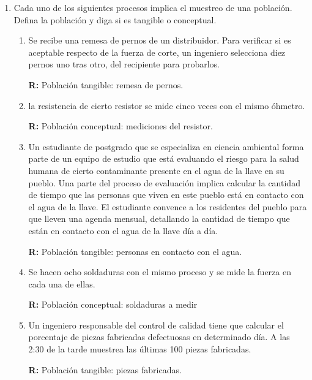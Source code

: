 \documentclass[10pt,a4paper]{book}
\begin{document}
\begin{enumerate}
	\item Cada uno de los siguientes procesos implica el muestreo de una población. Defina la población y diga si es tangible o conceptual.
	\begin{enumerate}
		\item Se recibe una remesa de pernos de un distribuidor. Para verificar si es aceptable respecto de la fuerza de corte, un ingeniero selecciona diez pernos uno tras otro, del recipiente para probarlos.
		
		\textbf{R:} Población tangible: remesa de pernos.\\
		
		\item la resistencia de cierto resistor se mide cinco veces con el mismo óhmetro.
		
		\textbf{R:} Población conceptual: mediciones del resistor.\\
		
		\item Un estudiante de postgrado que se especializa en ciencia ambiental forma parte de un equipo de estudio que está evaluando el riesgo para la salud humana de cierto contaminante presente en el agua de la llave en su pueblo. Una parte del proceso de evaluación implica calcular la cantidad de tiempo que las personas que viven en este pueblo está en contacto con el agua de la llave. El estudiante convence a los residentes del pueblo para que lleven una agenda mensual, detallando la cantidad de tiempo que están en contacto con el agua de la llave día a día.
	
		\textbf{R:} Población tangible: personas en contacto con el agua.\\
		
		\item  Se hacen ocho soldaduras con el mismo proceso y se mide la fuerza en cada una de ellas.
		
		\textbf{R:} Población conceptual: soldaduras a medir\\
		
		\item  Un ingeniero responsable del control de calidad tiene que calcular el porcentaje de piezas fabricadas defectuosas en determinado día. A las 2:30 de la tarde muestrea las últimas 100 piezas fabricadas.
		
		\textbf{R:} Población tangible: piezas fabricadas.\\
	\end{enumerate}
	

\end{enumerate}
\end{document}
